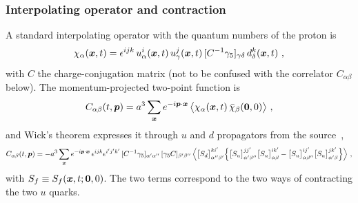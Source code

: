 \subsubsection{Interpolating operator and contraction}
A standard interpolating operator with the quantum numbers of the proton is~\cite{Lin:2014}
\begin{equation}
    \chi_\alpha(\boldsymbol{x},t)=\epsilon^{ijk}\,u^i_\alpha(\boldsymbol{x},t)\,u^j_\gamma(\boldsymbol{x},t)\,[C^{-1}\gamma_5]_{\gamma\delta}\,d^k_\delta(\boldsymbol{x},t) \ ,
    \label{eq:nucleon_interpolator}
\end{equation}
with $C$ the charge-conjugation matrix (not to be confused with the correlator $C_{\alpha\beta}$ below). The momentum-projected two-point function is
\begin{equation}
    C_{\alpha\beta}(t,\boldsymbol{p})=a^3\sum_{\boldsymbol{x}}e^{-i\boldsymbol{p}\cdot\boldsymbol{x}}\,\big\langle\chi_\alpha(\boldsymbol{x},t)\,\bar\chi_\beta(\boldsymbol{0},0)\big\rangle \ ,
    \label{eq:c2pt_def}
\end{equation}
and Wick's theorem expresses it through $u$ and $d$ propagators from the source~\cite{Gattringer:2010zz},
\begingroup\footnotesize
\begin{align}
    C_{\alpha\beta}(t,\boldsymbol{p})=-a^3\sum_{\boldsymbol{x}}e^{-i\boldsymbol{p}\cdot\boldsymbol{x}}\,\epsilon^{ijk}\epsilon^{i'j'k'}\,[C^{-1}\gamma_5]_{\alpha'\alpha''}\,[\gamma_5C]_{\beta'\beta''}\,
    \Big\langle\big[S_d\big]^{ki'}_{\alpha''\beta'}\Big\{\big[S_u\big]^{jj'}_{\alpha'\beta''}\big[S_u\big]^{ik'}_{\alpha\beta}-\big[S_u\big]^{ij'}_{\alpha\beta''}\big[S_u\big]^{jk'}_{\alpha'\beta}\Big\}\Big\rangle \ ,
    \label{eq:c2pt_contraction}
\end{align}
\endgroup
with $S_f\equiv S_f(\boldsymbol{x},t;\boldsymbol{0},0)$. The two terms correspond to the two ways of contracting the two $u$ quarks.

